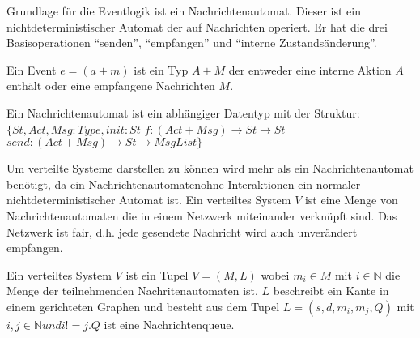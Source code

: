 Grundlage für die Eventlogik ist ein Nachrichtenautomat. Dieser ist ein
nichtdeterministischer Automat der auf Nachrichten operiert.
Er hat die drei Basisoperationen ``senden'', ``empfangen'' und ``interne
Zustandsänderung''.~\cite{bickford2003logic}

\begin{defi}
  Ein Event $e=(a+m)$ ist ein Typ $A+M$ der entweder eine interne Aktion $A$ enthält
  oder eine empfangene Nachrichten $M$.
\end{defi}

\begin{defi}
  Ein Nachrichtenautomat ist ein abhängiger Datentyp mit der Struktur:
  $\{St, Act, Msg: Type, init: St$
    $f:(Act+Msg)\rightarrow St\rightarrow St$
    $send:(Act+Msg)\rightarrow St\rightarrow MsgList\}$  
\end{defi}

Um verteilte Systeme darstellen zu können wird mehr als ein Nachrichtenautomat
benötigt, da ein Nachrichtenautomatenohne Interaktionen ein normaler
nichtdeterministischer Automat ist. Ein verteiltes System $V$ ist eine Menge von
Nachrichtenautomaten die in einem Netzwerk miteinander verknüpft sind.
Das Netzwerk ist fair, d.h. jede gesendete Nachricht wird auch unverändert
empfangen.~\cite{bickford2003logic}

\begin{defi}
  Ein verteiltes System $V$ ist ein Tupel $V=(M,L)$ wobei $m_i\in M$ mit $i\in
  \mathbb{N}$ die Menge der teilnehmenden Nachritenautomaten ist. $L$ beschreibt
  ein Kante in einem gerichteten Graphen und besteht aus dem Tupel $L=(s,d,m_i,m_j,Q)$ 
  mit $i,j\in \mathbb{N} und i!= j.Q$ ist eine Nachrichtenqueue.
\end{defi}


